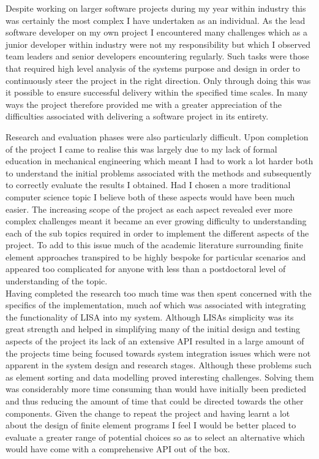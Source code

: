 \noindent
Despite working on larger software projects during my year within industry this was certainly the most complex I have undertaken as an individual. As the lead software developer on my own project I encountered many challenges which as a junior developer within industry were not my responsibility but which I observed team leaders and senior developers encountering regularly. Such tasks were those that required high level analysis of the systems purpose and design in order to continuously steer the project in the right direction. Only through doing this was it possible to ensure successful delivery within the specified time scales. In many ways the project therefore provided me with a greater appreciation of the difficulties associated with delivering a software project in its entirety. 


\noindent
Research and evaluation phases were also particularly difficult. Upon completion of the project I came to realise this was largely due to my lack of formal education in mechanical engineering which meant I had to work a lot harder both to understand the initial problems associated with the methods and subsequently to correctly evaluate the results I obtained. Had I chosen a more traditional computer science topic I believe both of these aspects would have been much easier. The increasing scope of the project as each aspect revealed ever more complex challenges meant it became an ever growing difficulty to understanding each of the sub topics required in order to implement the different aspects of the project. To add to this issue much of the academic literature surrounding finite element approaches transpired to be highly bespoke for particular scenarios and appeared too complicated for anyone with less than a postdoctoral level of understanding of the topic. \\

  

\noindent
Having completed the research too much time was then spent concerned with the specifics of the implementation, much aof which was associated with integrating the functionality of LISA into my system. Although LISAs simplicity was its great strength and helped in simplifying many of the initial design and testing aspects of the project its lack of an extensive API resulted in a large amount of the projects time being focused towards system integration issues which were not apparent in the system design and research stages. Although these problems such as element sorting and data modelling proved interesting challenges. Solving them was considerably more time consuming than would have initially been predicted and thus reducing the amount of time that could be directed towards the other components. Given the change to repeat the project and having learnt a lot about the design of finite element programs I feel I would be better placed to evaluate a greater range of potential choices so as to select an alternative which would have come with a comprehensive API out of the box. \\ 

